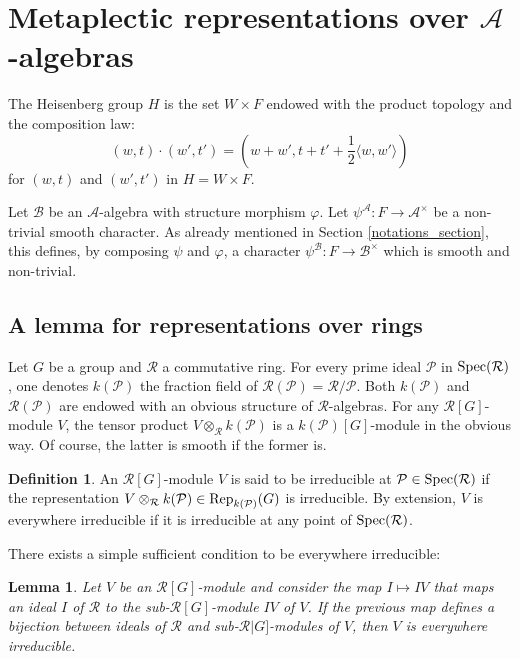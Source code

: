\documentclass[11pt]{article}
\theoremstyle{plain}
\newtheorem{lem}[theo]{Lemma}
\theoremstyle{definition}
\newtheorem{defi}[theo]{Definition}
\theoremstyle{plain}
\theoremstyle{definition}
\theoremstyle{plain}
\begin{document}
\section{Metaplectic representations over $\mathcal{A}$-algebras}

The Heisenberg group $H$ is the set $W \times F$ endowed with the product topology and the composition law:
$$(w,t) \cdot (w',t') = (w+w',t+t'+\frac{1}{2} \langle w, w' \rangle)$$
for $(w,t)$ and $(w',t')$ in $H = W \times F$.

Let $\mathcal{B}$ be an $\mathcal{A}$-algebra with structure morphism $\varphi$. Let $\psi^\mathcal{A} : F \to \mathcal{A}^\times$ be a non-trivial smooth character. As already mentioned in Section \ref{notations_section}, this defines, by composing $\psi$ and $\varphi$, a character $\psi^\mathcal{B} : F \to \mathcal{B}^\times$ which is smooth and non-trivial.


\subsection{A lemma for representations over rings}

Let $G$ be a group and $\mathcal{R}$ a commutative ring. For every prime ideal $\mathcal{P}$ in $\textup{Spec}(\mathcal{R})$, one denotes $k(\mathcal{P})$ the fraction field of $\mathcal{R}(\mathcal{P}) = \mathcal{R} / \mathcal{P}$. Both $k(\mathcal{P})$ and $\mathcal{R}(\mathcal{P})$ are endowed with an obvious structure of $\mathcal{R}$-algebras. For any $\mathcal{R}[G]$-module $V$, the tensor product $V \otimes_\mathcal{R} k(\mathcal{P})$ is a $k(\mathcal{P})[G]$-module in the obvious way. Of course, the latter is smooth if the former is.

\begin{defi} An $\mathcal{R}[G]$-module $V$ is said to be irreducible at $\mathcal{P} \in \textup{Spec}(\mathcal{R})$ if the representation $V \otimes_\mathcal{R} k(\mathcal{P}) \in \textup{Rep}_{k(\mathcal{P})}(G)$ is irreducible. By extension, $V$ is everywhere irreducible if it is irreducible at any point of $\textup{Spec}(\mathcal{R})$. \end{defi}

There exists a simple sufficient condition to be everywhere irreducible:

\begin{lem} \label{everywhere_irreducible_lemma} Let $V$ be an $\mathcal{R}[G]$-module and consider the map $I \mapsto IV$ that maps an ideal $I$ of $\mathcal{R}$ to the sub-$\mathcal{R}[G]$-module $IV$ of $V$. If the previous map defines a bijection between ideals of $\mathcal{R}$ and sub-$\mathcal{R}|G]$-modules of $V$, then $V$ is everywhere irreducible. \end{lem}
\end{document}
